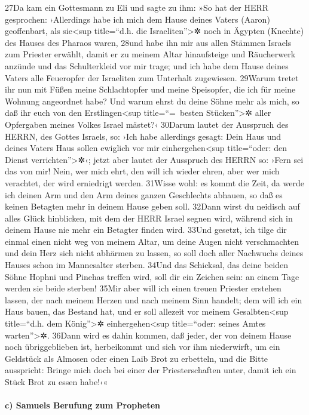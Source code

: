 27Da kam ein Gottesmann zu Eli und sagte zu ihm: »So hat der HERR
gesprochen: ›Allerdings habe ich mich dem Hause deines Vaters (Aaron)
geoffenbart, als sie\textless sup title=``d.h. die
Israeliten''\textgreater✲ noch in Ägypten (Knechte) des Hauses des
Pharaos waren, 28und habe ihn mir aus allen Stämmen Israels zum Priester
erwählt, damit er zu meinem Altar hinaufsteige und Räucherwerk anzünde
und das Schulterkleid vor mir trage; und ich habe dem Hause deines
Vaters alle Feueropfer der Israeliten zum Unterhalt zugewiesen. 29Warum
tretet ihr nun mit Füßen meine Schlachtopfer und meine Speisopfer, die
ich für meine Wohnung angeordnet habe? Und warum ehrst du deine Söhne
mehr als mich, so daß ihr euch von den Erstlingen\textless sup
title=``=~besten Stücken''\textgreater✲ aller Opfergaben meines Volkes
Israel mästet?‹ 30Darum lautet der Ausspruch des HERRN, des Gottes
Israels, so: ›Ich habe allerdings gesagt: Dein Haus und deines Vaters
Haus sollen ewiglich vor mir einhergehen\textless sup title=``oder: den
Dienst verrichten''\textgreater✲‹; jetzt aber lautet der Ausspruch des
HERRN so: ›Fern sei das von mir! Nein, wer mich ehrt, den will ich
wieder ehren, aber wer mich verachtet, der wird erniedrigt werden.
31Wisse wohl: es kommt die Zeit, da werde ich deinen Arm und den Arm
deines ganzen Geschlechts abhauen, so daß es keinen Betagten mehr in
deinem Hause geben soll. 32Dann wirst du neidisch auf alles Glück
hinblicken, mit dem der HERR Israel segnen wird, während sich in deinem
Hause nie mehr ein Betagter finden wird. 33Und gesetzt, ich tilge dir
einmal einen nicht weg von meinem Altar, um deine Augen nicht
verschmachten und dein Herz sich nicht abhärmen zu lassen, so soll doch
aller Nachwuchs deines Hauses schon im Mannesalter sterben. 34Und das
Schicksal, das deine beiden Söhne Hophni und Pinehas treffen wird, soll
dir ein Zeichen sein: an einem Tage werden sie beide sterben! 35Mir aber
will ich einen treuen Priester erstehen lassen, der nach meinem Herzen
und nach meinem Sinn handelt; dem will ich ein Haus bauen, das Bestand
hat, und er soll allezeit vor meinem Gesalbten\textless sup title=``d.h.
dem König''\textgreater✲ einhergehen\textless sup title=``oder: seines
Amtes warten''\textgreater✲. 36Dann wird es dahin kommen, daß jeder, der
von deinem Hause noch übriggeblieben ist, herbeikommt und sich vor ihm
niederwirft, um ein Geldstück als Almosen oder einen Laib Brot zu
erbetteln, und die Bitte ausspricht: Bringe mich doch bei einer der
Priesterschaften unter, damit ich ein Stück Brot zu essen habe!‹«

\hypertarget{c-samuels-berufung-zum-propheten}{%
\paragraph{c) Samuels Berufung zum
Propheten}\label{c-samuels-berufung-zum-propheten}}

